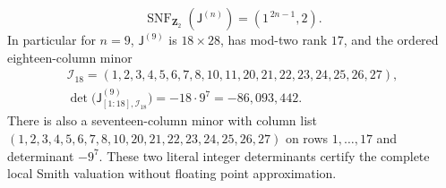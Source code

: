 \begin{theorem}
\begin{equation}
\boxed{\quad
\operatorname{SNF}_{\mathbf Z_2}
(\mathsf J^{(n)})
=(1^{\,2n-1},2).
\quad}
\end{equation}
In particular for $n=9$,
$\mathsf J^{(9)}$ is
$18\times28$,
has mod-two rank $17$,
and the ordered
eighteen-column minor
\begin{equation}\label{eq:dyadic-f135-nine-exact-minor}
\boxed{
\begin{gathered}
\mathcal I_{18}
=(1,2,3,4,5,6,7,8,10,11,
20,21,22,23,24,25,26,27),\\
\det\bigl(\mathsf J^{(9)}
_{[1:18],\mathcal I_{18}}\bigr)
=-18\cdot9^7=-86{,}093{,}442 .
\end{gathered}}
\end{equation}
There is also a
seventeen-column minor
with column list
$(1,2,3,4,5,6,7,8,10,
20,21,22,23,24,25,26,27)$
on rows $1,\dots,17$
and determinant $-9^7$.
These two literal
integer determinants
certify the complete
local Smith valuation
without floating
point approximation.
\end{theorem}

